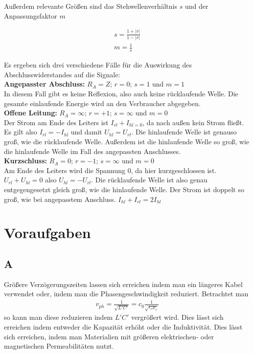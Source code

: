Außerdem relevante Größen sind das Stehwellenverhältnis $s$ und der Anpassungsfaktor $m$

\begin{align}
    s = \frac{1+|r|}{1-|r|} \\
    m = \frac 1s
\end{align}

Es ergeben sich drei verschiedene Fälle für die Auswirkung des Abschlusswiderstandes auf die Signale: \\

\textbf{Angepasster Abschluss:} $R_A = Z \text{; } r = 0 \text{; } s = 1 \text{ und } m= 1 $ \\
In diesem Fall gibt es keine Reflexion, also auch keine rücklaufende Welle. Die gesamte einlaufende Energie wird an den Verbraucher abgegeben.\\

\textbf{Offene Leitung:} $ R_A = \infty \text{; } r = +1 \text{; } s = \infty \text{ und } m = 0 $ \\
Der Strom am Ende des Leiters ist $ I_{rl} + I_{hl = 0}$, da nach außen kein Strom fließt. Es gilt also $ I_{rl} = -I_{hl}$ und damit $U_{hl} = U_{rl}$. Die hinlaufende Welle ist genauso groß, wie die rücklaufende Welle. Außerdem ist die hinlaufende Welle so groß, wie die hinlaufende Welle im Fall des angepassten Anschlusses.\\

\textbf{Kurzschluss:} $ R_A = 0 \text{; } r = -1 \text{; } s = \infty \text{ und } m = 0 $ \\
Am Ende des Leiters wird die Spannung 0, da hier kurzgeschlossen ist. $ U_{rl} + U_{hl} = 0 $ also $ U_{hl} = - U_{rl}$. Die rücklaufende Welle ist also genau entgegengesetzt gleich groß, wie die hinlaufende Welle. Der Strom ist doppelt so groß, wie bei angepasstem Anschluss. $I_{hl} + I_{rl} = 2 I_{hl}$

\chapter{Voraufgaben}

\section{A}
Größere Verzögerungszeiten lassen sich erreichen indem man ein längeres Kabel verwendet oder, indem man die Phasengeschwindigkeit reduziert. Betrachtet man
\begin{align}
    v_{ph} = \frac{1}{\sqrt{L' C'}} = c_0 \frac{1}{\sqrt{\epsilon_r \mu_r}}\label{vph}
\end{align}
so kann man diese reduzieren indem $L' C'$ vergrößert wird. Dies lässt sich erreichen indem entweder die Kapazität erhöht oder die Induktivität. Dies lässt sich erreichen, indem man Materialien mit größeren elektrischen- oder magnetischen Permeabilitäten nutzt.

